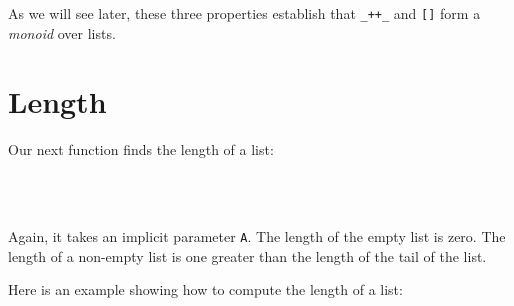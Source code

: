 As we will see later, these three properties establish that
\texttt{\_++\_} and \texttt{{[}{]}} form a \emph{monoid} over lists.

\hypertarget{length}{%
\section{Length}\label{length}}

Our next function finds the length of a list:

\begin{fence}
\begin{code}%
\>[0]\AgdaSpace{}%
\AgdaSymbol{:}\AgdaSpace{}%
\AgdaSpace{}%
\AgdaSymbol{\{}\AgdaSpace{}%
\AgdaSymbol{:}\AgdaSpace{}%
\AgdaSymbol{\}}\AgdaSpace{}%
\AgdaSpace{}%
\AgdaSpace{}%
\AgdaSpace{}%
\AgdaSpace{}%
\<%
\\
\>[0]\AgdaSpace{}%
\AgdaInductiveConstructor{[]}%
\>[17]\AgdaSymbol{=}%
\>[20]\<%
\\
\>[0]\AgdaSpace{}%
\AgdaSymbol{(}\AgdaSpace{}%
\AgdaSpace{}%
\AgdaSymbol{)}%
\>[17]\AgdaSymbol{=}%
\>[20]\AgdaSpace{}%
\AgdaSymbol{(}\AgdaSpace{}%
\AgdaSymbol{)}\<%
\end{code}
\end{fence}

Again, it takes an implicit parameter \texttt{A}. The length of the
empty list is zero. The length of a non-empty list is one greater than
the length of the tail of the list.

Here is an example showing how to compute the length of a list:

